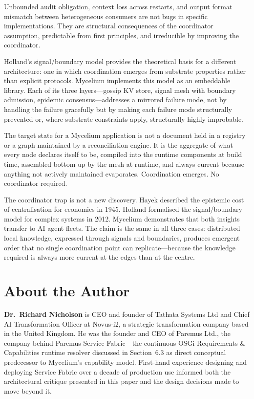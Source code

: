 \documentclass[11pt]{article}
\begin{document}
Unbounded audit obligation, context loss across restarts, and output format
mismatch between heterogeneous consumers are not bugs in specific implementations.
They are structural consequences of the coordinator assumption, predictable from
first principles, and irreducible by improving the coordinator.

Holland's signal/boundary model provides the theoretical basis for a different
architecture: one in which coordination emerges from substrate properties rather
than explicit protocols. Mycelium implements this model as an embeddable library.
Each of its three layers---gossip KV store, signal mesh with boundary admission,
epidemic consensus---addresses a mirrored failure mode, not by handling the
failure gracefully but by making each failure mode structurally prevented or,
where substrate constraints apply, structurally highly improbable.

The target state for a Mycelium application is not a document held in a registry
or a graph maintained by a reconciliation engine. It is the aggregate of what
every node declares itself to be, compiled into the runtime components at build
time, assembled bottom-up by the mesh at runtime, and always current because
anything not actively maintained evaporates. Coordination emerges. No coordinator
required.

The coordinator trap is not a new discovery. Hayek described the epistemic cost
of centralisation for economies in 1945. Holland formalised the signal/boundary
model for complex systems in 2012. Mycelium demonstrates that both insights
transfer to AI agent fleets. The claim is the same in all three cases:
distributed local knowledge, expressed through signals and boundaries, produces
emergent order that no single coordination point can replicate---because the
knowledge required is always more current at the edges than at the centre.



\section*{About the Author}

\textbf{Dr.\ Richard Nicholson} is CEO and founder of Tathata Systems Ltd and
Chief AI Transformation Officer at Novus-i2, a strategic transformation company
based in the United Kingdom. He was the founder and CEO of Paremus Ltd., the
company behind Paremus Service Fabric---the continuous OSGi Requirements \&
Capabilities runtime resolver discussed in Section~6.3 as direct conceptual
predecessor to Mycelium's capability model. First-hand experience designing and
deploying Service Fabric over a decade of production use informed both the
architectural critique presented in this paper and the design decisions made to
move beyond it.
\end{document}

